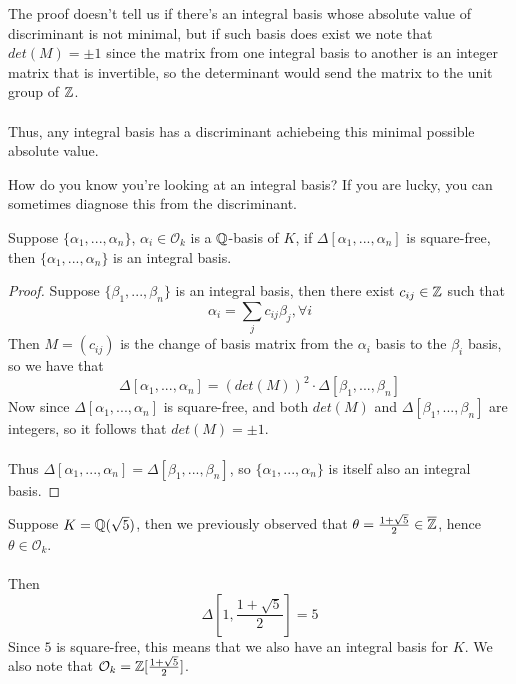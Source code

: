 \begin{remark}
The proof doesn't tell us if there's an integral basis whose absolute value of discriminant is not minimal, but if such basis does exist we note that $det(M) = \pm 1$ since the matrix from one integral basis to another is an integer matrix that is invertible, so the determinant would send the matrix to the unit group of $\mathbb{Z}$.\\\\
Thus, any integral basis has a discriminant achiebeing this minimal possible absolute value.
\end{remark}


\noindent How do you know you're looking at an integral basis? If you are lucky, you can sometimes diagnose this from the discriminant.

\begin{theorem}
Suppose $\{\alpha_1, ..., \alpha_n\}$, $\alpha_i \in \mathcal{O}_k$ is a $\mathbb{Q}$-basis of $K$, if $\Delta[\alpha_1, ..., \alpha_n]$ is square-free, then $\{\alpha_1, ..., \alpha_n\}$ is an integral basis.
\end{theorem}

\begin{proof}
Suppose $\{\beta_1, ..., \beta_n\}$ is an integral basis, then there exist $c_{ij} \in \mathbb{Z}$ such that
\[\alpha_i = \sum_{j} c_{ij} \beta_j, \forall i\]
Then $M = (c_{ij})$ is the change of basis matrix from the $\alpha_i$ basis to the $\beta_i$ basis, so we have that
\[\Delta[\alpha_1, ..., \alpha_n] = (det(M))^2 \cdot \Delta[\beta_1, ..., \beta_n]\]
Now since $\Delta[\alpha_1, ..., \alpha_n]$ is square-free, and both $det(M)$ and $\Delta[\beta_1, ..., \beta_n]$ are integers, so it follows that $det(M) = \pm 1$.\\\\
Thus $\Delta[\alpha_1, ..., \alpha_n] = \Delta[\beta_1, ..., \beta_n]$, so $\{\alpha_1, ..., \alpha_n\}$ is itself also an integral basis.
\end{proof}

\begin{example}
Suppose $K = \mathbb{Q}(\sqrt{5})$, then we previously observed that $\theta = \frac{1 + \sqrt{5}}{2} \in \overline{\mathbb{Z}}$, hence $\theta \in \mathcal{O}_k$.\\\\
Then
\[\Delta[1, \frac{1 + \sqrt{5}}{2}] = 5\]
Since $5$ is square-free, this means that we also have an integral basis for $K$. We also note that $\mathcal{O}_k = \mathbb{Z}[\frac{1 + \sqrt{5}}{2}]$.
\end{example}

